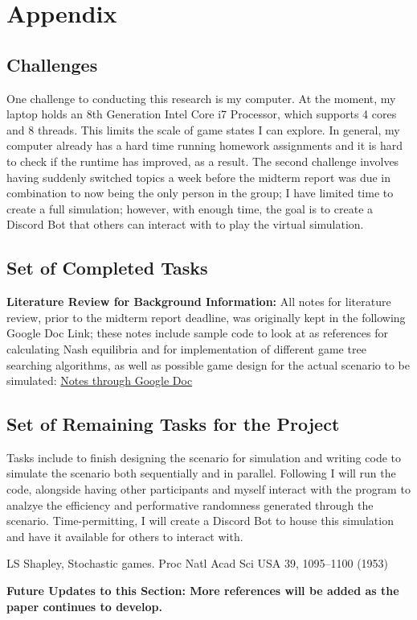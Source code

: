 \documentclass[conference]{IEEEtran}
\begin{document}
\color{black}
\section{Appendix}

\subsection{Challenges}
\noindent One challenge to conducting this research is my computer. At the moment, my laptop holds an 8th Generation Intel Core i7 Processor, which supports 4 cores and 8 threads. This limits the scale of game states I can explore. In general, my computer already has a hard time running homework assignments and it is hard to check if the runtime has improved, as a result. The second challenge involves having suddenly switched topics a week before the midterm report was due in combination to now being the only person in the group; I have limited time to create a full simulation; however, with enough time, the goal is to create a Discord Bot that others can interact with to play the virtual simulation.
\medskip

\subsection{Set of Completed Tasks}
\noindent \textbf{Literature Review for Background Information:} All notes for literature review, prior to the midterm report deadline, was originally kept in the following Google Doc Link; these notes include sample code to look at as references for calculating Nash equilibria and for implementation of different game tree searching algorithms, as well as possible game design for the actual scenario to be simulated: \href{https://docs.google.com/document/d/1AJQZnmTxFYiWPS9glJMl91zoUWLQXalFPKzBJcVB5uc/edit?usp=sharing}{\color{blue}Notes through Google Doc}
\medskip

\color{black}
\subsection{Set of Remaining Tasks for the Project}
\noindent Tasks include to finish designing the scenario for simulation and writing code to simulate the scenario both sequentially and in parallel. Following I will run the code, alongside having other participants and myself interact with the program to analzye the efficiency and performative randomness generated through the scenario. Time-permitting, I will create a Discord Bot to house this simulation and have it available for others to interact with.
\bigskip

\begin{thebibliography}{00}
LS Shapley, Stochastic games. Proc Natl Acad Sci USA 39, 1095–1100 (1953)  
\end{thebibliography}
\color{red} \noindent \textbf{Future Updates to this Section: More references will be added as the paper continues to develop.}
\medskip
\end{document}
